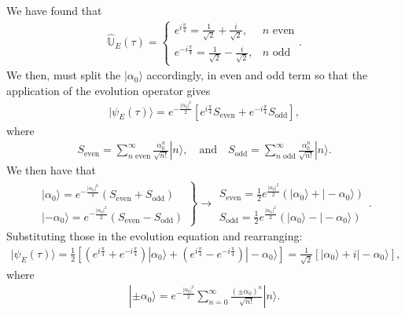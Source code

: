 \documentclass[letterpaper,11pt,twoside]{article}
\newcommand{\ket}[1]{|#1\rangle}
\begin{document}
\begin{enumerate}[itemsep=0pt,topsep=0pt,label=\alph*)]
\begin{align*}
  \end{align*}
  We have found that 
  \begin{align*}
    \hat{\mathbb{U}}_E(\tau)=\begin{cases}
      e^{i\frac{\pi}{4}}=\frac{1}{\sqrt{2}}+\frac{i}{\sqrt{2}},&\text{$n$ even}\\
      e^{-i\frac{\pi}{4}}=\frac{1}{\sqrt{2}}-\frac{i}{\sqrt{2}},&\text{$n$ odd}
    \end{cases}.
  \end{align*}
  We then, must split the $\ket{\alpha_0}$ accordingly, in even and odd term so that the application of the evolution operator gives
  \begin{align*}
    \ket{\psi_E(\tau)}=e^{-\frac{|\alpha_0|^2}{2}}\left[e^{i\frac{\pi}{4}}S_{\text{even}}+e^{-i\frac{\pi}{4}}S_{\text{odd}}\right],
  \end{align*}
  where 
  \begin{align}
    S_{\text{even}}=\sum_{\text{$n$ even}}^\infty\frac{\alpha_0^n}{\sqrt{n!}}\ket{n},\quad\text{and}\quad S_{\text{odd}}=\sum_{\text{$n$ odd}}^\infty\frac{\alpha_0^n}{\sqrt{n!}}\ket{n}.
  \end{align}
  We then have that 
  \begin{align*}
    \left.\begin{array}{l}
      \ket{\alpha_0}=e^{-\frac{|\alpha_0|^2}{2}}(S_{\text{even}}+S_{\text{odd}})\\
      \ket{-\alpha_0}=e^{-\frac{|\alpha_0|^2}{2}}(S_{\text{even}}-S_{\text{odd}})      
    \end{array}\right\}\longrightarrow\begin{array}{l}
      S_{\text{even}}=\frac{1}{2}e^{\frac{|\alpha_0|^2}{2}}(\ket{\alpha_0}+\ket{-\alpha_0})\\
      S_{\text{odd}}=\frac{1}{2}e^{\frac{|\alpha_0|^2}{2}}(\ket{\alpha_0}-\ket{-\alpha_0})
    \end{array}.
  \end{align*}
  Substituting those in the evolution equation and rearranging:
  \begin{align*}
    \ket{\psi_E(\tau)}=\frac{1}{2}\left[(e^{i\frac{\pi}{4}}+e^{-i\frac{\pi}{4}})\ket{\alpha_0}+(e^{i\frac{\pi}{4}}-e^{-i\frac{\pi}{4}})\ket{-\alpha_0}\right]=\frac{1}{\sqrt{2}}[\ket{\alpha_0}+i\ket{-\alpha_0}],
  \end{align*}
  where 
  \begin{align*}
    \ket{\pm\alpha_0}=e^{-\frac{|\alpha_0|^2}{2}}\sum_{n=0}^\infty\frac{(\pm\alpha_0)^n}{\sqrt{n!}}\ket{n}.

\end{align*}
\end{enumerate}
\end{document}
